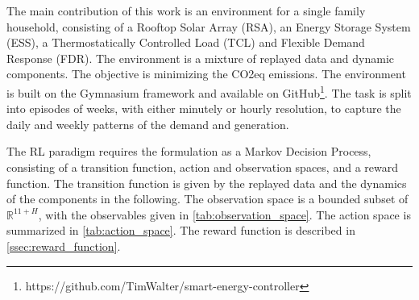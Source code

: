 The main contribution of this work is an environment for a single family household, consisting of a Rooftop Solar Array (RSA), an Energy Storage System (ESS), a Thermostatically Controlled Load (TCL) and Flexible Demand Response (FDR). The environment is a mixture of replayed data and dynamic components. The objective is minimizing the CO2eq emissions. The environment is built on the Gymnasium framework \cite{Towers.2023} and available on GitHub\footnote{https://github.com/TimWalter/smart-energy-controller}. The task is split into episodes of weeks, with either minutely or hourly resolution, to capture the daily and weekly patterns of the demand and generation.
\par
The RL paradigm requires the formulation as a Markov Decision Process, consisting of a transition function, action and observation spaces, and a reward function. The transition function is given by the replayed data and the dynamics of the components in the following. The observation space is a bounded subset of $\mathbb{R}^{11+H}$, with the observables given in \cref{tab:observation_space}. The action space is summarized in  \cref{tab:action_space}. The reward function is described in \cref{ssec:reward_function}.

